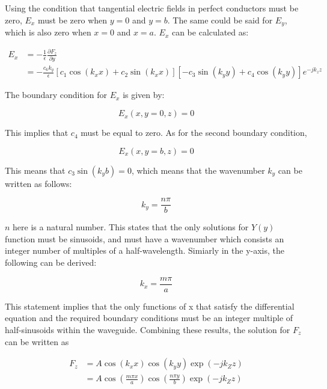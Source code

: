 \documentclass[a4paper,12pt]{report}
\begin{document}
Using the condition that tangential electric fields in perfect conductors must be zero,
$E_x$ must be zero when $y=0$ and $y=b$.
The same could be said for $E_y$,
which is also zero when $x=0$ and $x=a$.
$E_x$ can be calculated as:

\begin{equation}
  \begin{split}
    E_x &= -\frac{1}{\epsilon} \frac{\partial F_z}{\partial y} \\
        &= - \frac{c_6 k_y}{\epsilon}[c_1 \cos (k_x x) + c_2 \sin (k_x x)][-c_3 \sin (k_y y) + c_4 \cos(k_y y)]e^{-jk_z z}
  \end{split}
\end{equation}

The boundary condition for $E_x$ is given by:

\begin{equation}
  E_x(x, y=0, z) = 0
\end{equation}

This implies that $c_4$ must be equal to zero.
As for the second boundary condition,

\begin{equation}
  E_x(x, y=b, z) = 0
\end{equation}

This means that $c_3 \sin (k_y b) = 0$, which means that the wavenumber $k_y$
can be written as follows:

\begin{equation} \label{eq:wavenumber_y}
  k_y = \frac{n\pi}{b}
\end{equation}

$n$ here is a natural number.
This states that the only solutions for $Y(y)$ function must be sinusoids,
and must have a wavenumber
which consists an integer number of multiples of a half-wavelength.
Simiarly in the y-axis, the following can be derived:

\begin{equation} \label{eq:wavenumber_x}
  k_x = \frac{m\pi}{a}
\end{equation}

This statement implies that the only functions of x that satisfy
the differential equation and the required boundary conditions
must be an integer multiple of half-sinusoids within the waveguide.
Combining these results, the solution for $F_z$ can be written as

\begin{equation}
  \begin{split}
    F_z &= A \cos(k_x x)\cos(k_y y)\exp(-j k_Z z) \\
        & = A \cos(\frac{m\pi x}{a}) \cos(\frac{n \pi y}{b})\exp(-j k_Z z)
  \end{split}
\end{equation}
\end{document}
